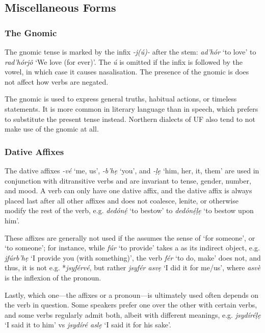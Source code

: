 \documentclass[a4paper, 12pt, twoside, final]{article}
\let \w \textit
\begin{document}
\subsection{Miscellaneous Forms}
\subsubsection{The Gnomic}\label{subsubsec:gnomic}
The gnomic tense is marked by the infix \w{-j(ú)-} after the stem: \w{ad’hór} ‘to love’ to \w{rad’hórjô} ‘We love (for ever)’.
The \w{ú} is omitted if the infix is followed by the vowel, in which case it causes nasalisation. The presence of the gnomic
is does not affect how verbs are negated.

The gnomic is used to express general truths, habitual actions, or timeless statements. It is more common in
literary language than in speech, which prefers to substitute the present tense instead. Northern dialects
of UF also tend to not make use of the gnomic at all.

\subsubsection{Dative Affixes}\label{subsubsec:dative-affixes}
The dative affixes \w{-vé} ‘me, us’, \w{-b’hẹ} ‘you’, and \w{-ḷẹ} ‘him, her, it, them’ are used in conjunction with
ditransitive verbs and are invariant to tense, gender, number, and mood. A verb can only have one dative affix, and
the dative affix is always placed last after all other affixes and does not coalesce, lenite, or otherwise modify
the rest of the verb, e.g. \w{dedónẹ́} ‘to bestow’ to \w{dedónẹ́ḷẹ} ‘to bestow upon him’.

These affixes are generally not used if the  assumes the sense of ‘for someone’, or ‘to someone’; for instance, while
\w{fúr} ‘to provide’ takes a  as its indirect object, e.g. \w{jfúrb’hẹ} ‘I provide you (with something)’, the verb
\w{fér} ‘to do, make’ does not, and thus, it is not e.g. *\w{jsyférvé}, but rather \w{jsyfér asvẹ} ‘I did it for me/us’, where
\w{asvè} is the  inflexion of the  pronoun.

Lastly, which one—the  affixes or a  pronoun—is ultimately used often depends on the verb in question. Some speakers prefer
one over the other with certain verbs, and some verbs regularly admit both, albeit with different meanings, e.g. \w{jsydíréḷẹ}
‘I said it to him’ vs \w{jsydíré aslẹ} ‘I said it for his sake’.
\end{document}
